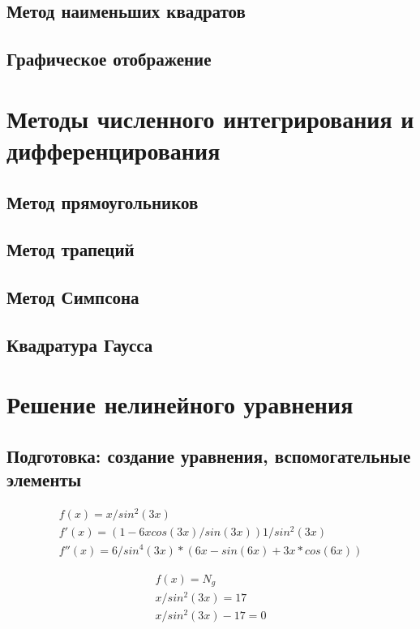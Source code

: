 \documentclass{article}
\begin{document}
\subsection{Метод наименьших квадратов}
\subsection{Графическое отображение}

\section{Методы численного интегрирования и дифференцирования}
\subsection{Метод прямоугольников}
\subsection{Метод трапеций}
\subsection{Метод Симпсона}
\subsection{Квадратура Гаусса}

\section{Решение нелинейного уравнения}
\subsection{Подготовка: создание уравнения, вспомогательные элементы}

\begin{displaymath}
  \begin{array}{ccc}
    f(x) = x / sin^2(3x)  \\
    f'(x) = (1 - 6x cos(3 x) / sin(3 x)) 1/sin^2(3 x)\\
    f''(x) = 6/sin^4(3x) * (6x - sin(6x) + 3x * cos(6x))
  \end{array}
\end{displaymath}

\begin{displaymath}
  \begin{array}{ccc}
    f(x) = N_{g}  \\
    x / sin^2(3x) = 17 \\
    x / sin^2(3x) - 17 = 0 \\
  \end{array}
\end{displaymath}
\end{document}
